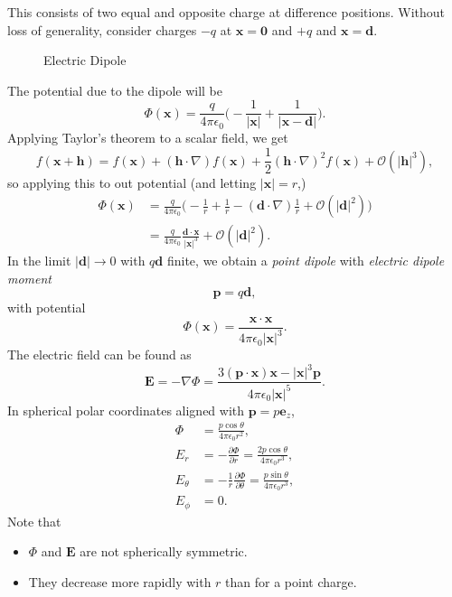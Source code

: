 \documentclass[12pt]{article}
\begin{document}
This consists of two equal and opposite charge at difference positions. Without loss of generality, consider charges $-q$ at $\mathbf{x} = \mathbf{0}$ and $+q$ and $\mathbf{x} = \mathbf{d}$.

\begin{figure}[h]
	\centering
	\caption{Electric Dipole}
	\label{fig:electric_dipole}
	\vspace{1em}
\end{figure}

The potential due to the dipole will be
\[
\Phi(\mathbf{x}) = \frac{q}{4 \pi \epsilon_0} \biggl( - \frac{1}{|\mathbf{x}|} + \frac{1}{|\mathbf{x} - \mathbf{d}|} \biggr)
.\]
Applying Taylor's theorem to a scalar field, we get
\[
f(\mathbf{x} + \mathbf{h}) = f(\mathbf{x}) + (\mathbf{h} \cdot \nabla) f(\mathbf{x}) + \frac{1}{2} (\mathbf{h} \cdot \nabla)^2 f(\mathbf{x}) + \mathcal{O}(|\mathbf{h}|^3)
,\]
so applying this to out potential (and letting $|\mathbf{x}| = r$,)
\begin{align*}
	\Phi(\mathbf{x}) &= \frac{q}{4 \pi \epsilon_0} \biggl( -\frac{1}{r} + \frac{1}{r} - (\mathbf{d} \cdot \nabla) \frac{1}{r} + \mathcal{O}(|\mathbf{d}|^2)\biggr) \\
			 &= \frac{q}{4 \pi \epsilon_0} \frac{\mathbf{d} \cdot \mathbf{x}}{|\mathbf{x}|^3} + \mathcal{O}(|\mathbf{d}|^2).
\end{align*}
In the limit $|\mathbf{d}| \to 0$ with $q \mathbf{d}$ finite, we obtain a \emph{point dipole} with \emph{electric dipole moment}
\[
\mathbf{p} = q \mathbf{d}
,\]
with potential
\[
\Phi(\mathbf{x}) = \frac{\mathbf{x} \cdot \mathbf{x}}{4 \pi \epsilon_0 |\mathbf{x}|^3}
.\]
The electric field can be found as
\[
\mathbf{E} = - \nabla \Phi = \frac{3(\mathbf{p} \cdot \mathbf{x})\mathbf{x} - |\mathbf{x}|^3 \mathbf{p}}{4 \pi \epsilon_0 |\mathbf{x}|^{5}}
.\]
In spherical polar coordinates aligned with $\mathbf{p}= p \mathbf{e}_z$,
\begin{align*}
	\Phi &= \frac{p \cos \theta}{4 \pi \epsilon_0 r^2}, \\
	E_r &= - \frac{\partial \Phi}{\partial r} = \frac{2 p \cos \theta}{4 \pi \epsilon_0 r^3}, \\
	E_\theta &= - \frac{1}{r} \frac{\partial \Phi}{\partial \theta} = \frac{p \sin \theta}{4 \pi \epsilon_0 r^3}, \\
	E_\phi &= 0.
\end{align*}
Note that
\begin{itemize}
	\item $\Phi$ and $\mathbf{E}$ are not spherically symmetric.
	\item They decrease more rapidly with $r$ than for a point charge.
\end{itemize}
\end{document}
